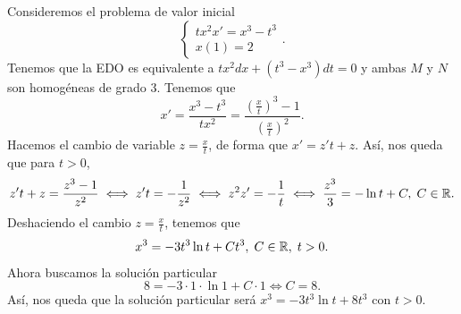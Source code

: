 \begin{eg}
Consideremos el problema de valor inicial
\[
\begin{cases}
t x^{2}x' = x^{3}-t ^{3} \\
x\left(1\right) = 2
\end{cases}
.\]
Tenemos que la EDO es equivalente a $\displaystyle tx^{2}dx +\left(t ^{3}-x^{3}\right)dt = 0 $ y ambas $\displaystyle M $ y $\displaystyle N $ son homogéneas de grado 3. Tenemos que 
\[x'=\frac{x^{3}-t ^{3}}{tx^{2}} = \frac{\left(\frac{x}{t}\right)^{3}-1}{\left(\frac{x}{t}\right)^{2}} .\]
Hacemos el cambio de variable $\displaystyle z = \frac{x}{t} $, de forma que $\displaystyle x' = z't + z $. Así, nos queda que para $\displaystyle t > 0 $,
\[z't + z = \frac{z^{3}-1}{z^{2}} \iff z't = -\frac{1}{z^{2}} \iff z^{2}z' = -\frac{1}{t} \iff \frac{z^{3}}{3}= - \ln t + C, \; C \in \mathbb{R} .\]
Deshaciendo el cambio $\displaystyle z = \frac{x}{t} $, tenemos que 
\[x^{3} = -3t ^{3}\ln t + Ct ^{3}, \; C \in \mathbb{R}, \; t > 0 .\]
Ahora buscamos la solución particular
\[8 = -3 \cdot 1 \cdot \ln 1 + C \cdot 1 \iff C = 8 .\]
Así, nos queda que la solución particular será $\displaystyle x^{3}= -3t ^{3}\ln t + 8 t ^{3} $ con $\displaystyle t > 0 $. 
\end{eg}

